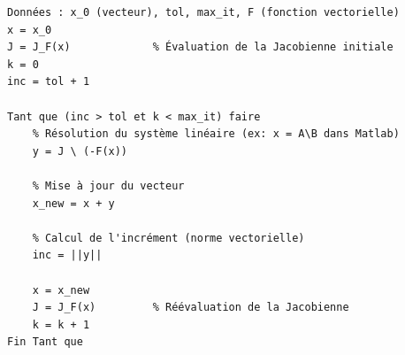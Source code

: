 \begin{algorithme}
\begin{verbatim}
Données : x_0 (vecteur), tol, max_it, F (fonction vectorielle)
x = x_0
J = J_F(x)             % Évaluation de la Jacobienne initiale
k = 0
inc = tol + 1

Tant que (inc > tol et k < max_it) faire
    % Résolution du système linéaire (ex: x = A\B dans Matlab)
    y = J \ (-F(x)) 

    % Mise à jour du vecteur
    x_new = x + y

    % Calcul de l'incrément (norme vectorielle)
    inc = ||y|| 

    x = x_new
    J = J_F(x)         % Réévaluation de la Jacobienne
    k = k + 1
Fin Tant que
\end{verbatim}
\end{algorithme}